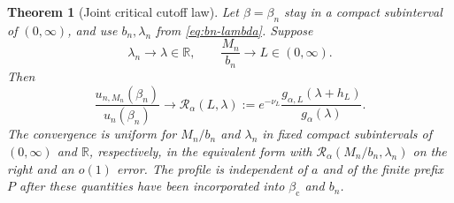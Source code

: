 \documentclass[11pt,a4paper]{article}
\numberwithin{equation}{section}
\newtheorem{theorem}{Theorem}[section]
\theoremstyle{definition}
\theoremstyle{remark}
\newcommand{\R}{\mathbb R}
\newcommand{\bc}{\beta_{\mathrm c}}
\newcommand{\Ra}{\mathcal R_\alpha}
\begin{document}
\begin{theorem}[Joint critical cutoff law]
\label{thm:cutoff}
Let $\beta=\beta_n$ stay in a compact subinterval of $(0,\infty)$, and
use $b_n,\lambda_n$ from \eqref{eq:bn-lambda}. Suppose
\[
 \lambda_n\longrightarrow\lambda\in\R,\qquad
 \frac{M_n}{b_n}\longrightarrow L\in(0,\infty).
\]
Then
\begin{equation}\label{eq:cutoff-profile}
 \boxed{\quad
 \frac{u_{n,M_n}(\beta_n)}{u_n(\beta_n)}
 \longrightarrow
 \Ra(L,\lambda):=
 e^{-\nu_L}\frac{g_{\alpha,L}(\lambda+h_L)}{g_\alpha(\lambda)}.
 \quad}
\end{equation}
The convergence is uniform for $M_n/b_n$ and $\lambda_n$ in fixed compact
subintervals of $(0,\infty)$ and $\R$, respectively, in the equivalent
form with $\Ra(M_n/b_n,\lambda_n)$ on the right and an $o(1)$ error.
The profile is independent of $a$ and of the finite prefix $P$ after
these quantities have been incorporated into $\bc$ and $b_n$.
\end{theorem}
\end{document}
